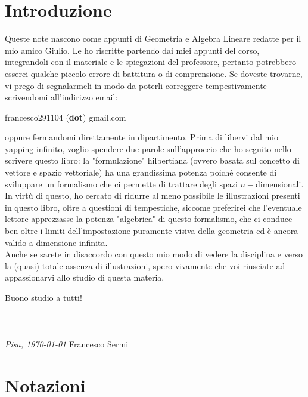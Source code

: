 \documentclass[12pt, twoside, italian]{book}
\begin{document}
	\cleardoublepage
	\pagestyle{fancy}
	\tableofcontents
	\chapter*{Introduzione}
	\pagestyle{empty}
	\thispagestyle{empty}
	\pagestyle{fancy}
	Queste note nascono come appunti di Geometria e Algebra Lineare redatte per il mio amico Giulio. Le ho riscritte partendo dai miei appunti del corso, integrandoli con il materiale e le spiegazioni del professore, pertanto potrebbero esserci qualche piccolo errore di battitura o di comprensione. Se doveste trovarne, vi prego di segnalarmeli in modo da poterli correggere tempestivamente scrivendomi all'indirizzo email:	
	\begin{center}
		francesco291104 (\textbf{dot}) gmail.com
	\end{center}
	oppure fermandomi direttamente in dipartimento. Prima di libervi dal mio yapping infinito, voglio spendere due parole sull'approccio che ho seguito nello scrivere questo libro: la "formulazione" hilbertiana (ovvero basata sul concetto di vettore e spazio vettoriale) ha una grandissima potenza poiché consente di sviluppare un formalismo che ci permette di trattare degli spazi $n-$dimensionali. In virtù di questo, ho cercato di ridurre al
	meno possibile le illustrazioni presenti in questo libro, oltre a questioni di tempestiche, siccome preferirei che l'eventuale lettore apprezzasse la potenza "algebrica" di questo formalismo, che ci conduce ben oltre i limiti dell'impostazione puramente visiva della geometria ed è ancora valido a dimensione infinita. \\
	Anche se sarete in disaccordo con questo mio modo di vedere la disciplina e verso la (quasi) totale assenza di illustrazioni, spero vivamente che voi riusciate ad appassionarvi allo studio di questa materia.\

	Buono studio a tutti! \\ \\ \\ \\
	\emph{Pisa, \today} \hfill Francesco Sermi\
	\vfill
	\cleardoublepage
	\chapter*{Notazioni}
	\pagestyle{empty}
	\thispagestyle{empty}
	\pagestyle{fancy}
\end{document}
